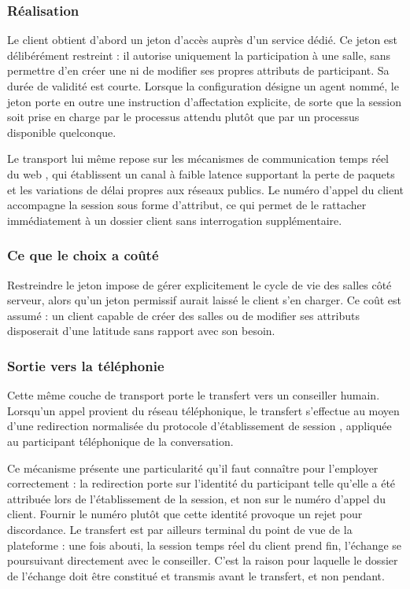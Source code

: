 \subsubsection{Réalisation}

Le client obtient d'abord un jeton d'accès auprès d'un service dédié. Ce jeton est délibérément restreint : il autorise uniquement la participation à une salle, sans permettre d'en créer une ni de modifier ses propres attributs de participant. Sa durée de validité est courte. Lorsque la configuration désigne un agent nommé, le jeton porte en outre une instruction d'affectation explicite, de sorte que la session soit prise en charge par le processus attendu plutôt que par un processus disponible quelconque.

Le transport lui même repose sur les mécanismes de communication temps réel du web \cite{webrtc}, qui établissent un canal à faible latence supportant la perte de paquets et les variations de délai propres aux réseaux publics. Le numéro d'appel du client accompagne la session sous forme d'attribut, ce qui permet de le rattacher immédiatement à un dossier client sans interrogation supplémentaire.

\subsubsection{Ce que le choix a coûté}

Restreindre le jeton impose de gérer explicitement le cycle de vie des salles côté serveur, alors qu'un jeton permissif aurait laissé le client s'en charger. Ce coût est assumé : un client capable de créer des salles ou de modifier ses attributs disposerait d'une latitude sans rapport avec son besoin.

\subsubsection{Sortie vers la téléphonie}

Cette même couche de transport porte le transfert vers un conseiller humain. Lorsqu'un appel provient du réseau téléphonique, le transfert s'effectue au moyen d'une redirection normalisée du protocole d'établissement de session \cite{sip}, appliquée au participant téléphonique de la conversation.

Ce mécanisme présente une particularité qu'il faut connaître pour l'employer correctement : la redirection porte sur l'identité du participant telle qu'elle a été attribuée lors de l'établissement de la session, et non sur le numéro d'appel du client. Fournir le numéro plutôt que cette identité provoque un rejet pour discordance. Le transfert est par ailleurs terminal du point de vue de la plateforme : une fois abouti, la session temps réel du client prend fin, l'échange se poursuivant directement avec le conseiller. C'est la raison pour laquelle le dossier de l'échange doit être constitué et transmis avant le transfert, et non pendant.

